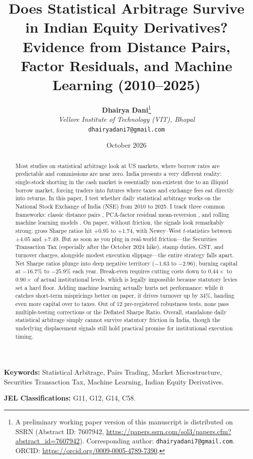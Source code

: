 \documentclass[11pt,a4paper]{article}
\title{\textbf{Does Statistical Arbitrage Survive in Indian Equity Derivatives?}\\
\large Evidence from Distance Pairs, Factor Residuals, and Machine Learning (2010--2025)}
\author{
    \textbf{Dhairya Dani}\thanks{A preliminary working paper version of this manuscript is distributed on SSRN (Abstract ID: 7607942, \url{https://papers.ssrn.com/sol3/papers.cfm?abstract_id=7607942}). Corresponding author: \texttt{dhairyadani7@gmail.com}. ORCID: \url{https://orcid.org/0009-0005-4789-7390}.} \\
    \textit{Vellore Institute of Technology (VIT), Bhopal} \\
    \texttt{dhairyadani7@gmail.com}
}
\date{October 2026}
\begin{document}
\maketitle

\begin{abstract}
Most studies on statistical arbitrage look at US markets, where borrow rates are predictable and commissions are near zero. India presents a very different reality: single-stock shorting in the cash market is essentially non-existent due to an illiquid borrow market, forcing traders into futures where taxes and exchange fees eat directly into returns. In this paper, I test whether daily statistical arbitrage works on the National Stock Exchange of India (NSE) from 2010 to 2025. I track three common frameworks: classic distance pairs \citep{gatev2006pairs}, PCA-factor residual mean-reversion \citep{avellaneda2010statistical}, and rolling machine learning models \citep{guijarro2021deep}. On paper, without friction, the signals look remarkably strong: gross Sharpe ratios hit $+0.95$ to $+1.74$, with Newey--West $t$-statistics between $+4.05$ and $+7.49$. But as soon as you plug in real-world friction---the Securities Transaction Tax (especially after the October 2024 hike), stamp duties, GST, and turnover charges, alongside modest execution slippage---the entire strategy falls apart. Net Sharpe ratios plunge into deep negative territory ($-1.63$ to $-2.96$), burning capital at $-16.7\%$ to $-25.9\%$ each year. Break-even requires cutting costs down to $0.44\times$ to $0.90\times$ of actual institutional levels, which is legally impossible because statutory levies set a hard floor. Adding machine learning actually hurts net performance: while it catches short-term mispricings better on paper, it drives turnover up by 34\%, handing even more capital over to taxes. Out of 12 pre-registered robustness tests, none pass multiple-testing corrections or the Deflated Sharpe Ratio. Overall, standalone daily statistical arbitrage simply cannot survive statutory friction in India, though the underlying displacement signals still hold practical promise for institutional execution timing.
\end{abstract}

\vspace{1em}
\noindent \textbf{Keywords:} Statistical Arbitrage, Pairs Trading, Market Microstructure, Securities Transaction Tax, Machine Learning, Indian Equity Derivatives.

\vspace{0.5em}
\noindent \textbf{JEL Classifications:} G11, G12, G14, C58.
\end{document}
